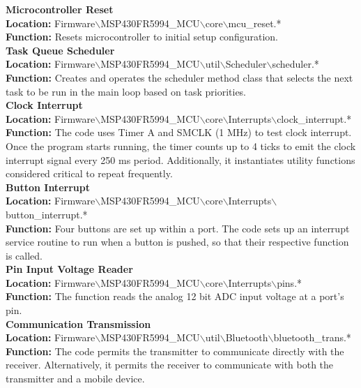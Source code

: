 \documentclass[12pt]{article}
\begin{document}
\noindent
\textbf{
Microcontroller Reset\\
Location: 
}
Firmware$\backslash$MSP430FR5994\_MCU$\backslash$core$\backslash$mcu\_reset.*\\
\textbf{
Function: }
Resets microcontroller to initial setup configuration.\\
 
 \noindent
\textbf{
Task Queue Scheduler\\
Location: 
}
Firmware$\backslash$MSP430FR5994\_MCU$\backslash$util$\backslash$Scheduler$\backslash$scheduler.*\\
\textbf{
Function: }
Creates and operates the scheduler method class that selects the next task to be run in the main loop based on task priorities. \\
 
 \noindent
\textbf{
Clock Interrupt\\
Location: 
}
Firmware$\backslash$MSP430FR5994\_MCU$\backslash$core$\backslash$Interrupts$\backslash$clock\_interrupt.*\\
\textbf{
Function: }
The code uses Timer A and SMCLK (1 MHz) to test clock interrupt. Once the program starts running, the timer counts up to 4 ticks to emit the clock interrupt signal every 250 ms period.  Additionally, it instantiates utility functions considered critical to repeat frequently.\\
 
 \noindent
\textbf{
Button Interrupt\\
Location: 
}
Firmware$\backslash$MSP430FR5994\_MCU$\backslash$core$\backslash$Interrupts$\backslash$button\_interrupt.*\\
\textbf{
Function: }
Four buttons are set up within a port. The code sets up an interrupt service routine to run when a button is pushed, so that their respective function is called. \\
 
 \noindent
\textbf{
Pin Input Voltage Reader \\
Location: 
}
Firmware$\backslash$MSP430FR5994\_MCU$\backslash$core$\backslash$Interrupts$\backslash$pins.*\\
\textbf{
Function: }
The function reads the analog 12 bit ADC input voltage at a port’s pin.\\
 
 \noindent
\textbf{
Communication Transmission\\
Location: 
}
Firmware$\backslash$MSP430FR5994\_MCU$\backslash$util$\backslash$Bluetooth$\backslash$bluetooth\_trans.*\\
\textbf{
Function: }
The code permits the transmitter to communicate directly with the receiver.  Alternatively, it permits the receiver to communicate with both the transmitter and a mobile device.\\
 
\end{document}
